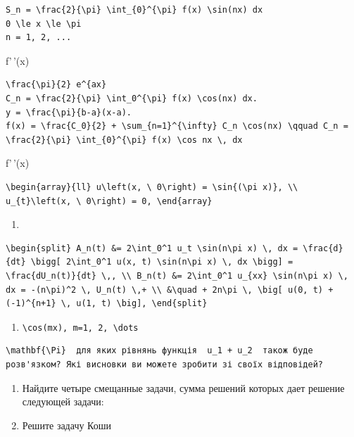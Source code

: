 \documentclass[
  ukrainian,
]{article}
\providecommand{\tightlist}{%
  \setlength{\itemsep}{0pt}\setlength{\parskip}{0pt}}
\begin{document}
\begin{verbatim}
S_n = \frac{2}{\pi} \int_{0}^{\pi} f(x) \sin(nx) dx
0 \le x \le \pi
n = 1, 2, ...
\end{verbatim}

f'\,'(x)

\begin{verbatim}
\frac{\pi}{2} e^{ax}
C_n = \frac{2}{\pi} \int_0^{\pi} f(x) \cos(nx) dx.
y = \frac{\pi}{b-a}(x-a).
f(x) = \frac{C_0}{2} + \sum_{n=1}^{\infty} C_n \cos(nx) \qquad C_n = \frac{2}{\pi} \int_{0}^{\pi} f(x) \cos nx \, dx
\end{verbatim}

f'\,'(x)

\begin{verbatim}
\begin{array}{ll} u\left(x, \ 0\right) = \sin{(\pi x)}, \\ u_{t}\left(x, \ 0\right) = 0, \end{array}
\end{verbatim}

\begin{enumerate}
\def\labelenumi{\alph{enumi})}
\tightlist
\item
\end{enumerate}

\begin{verbatim}
\begin{split} A_n(t) &= 2\int_0^1 u_t \sin(n\pi x) \, dx = \frac{d}{dt} \bigg[ 2\int_0^1 u(x, t) \sin(n\pi x) \, dx \bigg] = \frac{dU_n(t)}{dt} \,, \\ B_n(t) &= 2\int_0^1 u_{xx} \sin(n\pi x) \, dx = -(n\pi)^2 \, U_n(t) \,+ \\ &\quad + 2n\pi \, \big[ u(0, t) + (-1)^{n+1} \, u(1, t) \big], \end{split}
\end{verbatim}

\begin{enumerate}
\def\labelenumi{\arabic{enumi}.}
\setcounter{enumi}{4}
\tightlist
\item
  \texttt{\textbackslash{}cos(mx),\ m=1,\ 2,\ \textbackslash{}dots}
\end{enumerate}

\begin{verbatim}
\mathbf{\Pi}  для яких рівнянь функція  u_1 + u_2  також буде розв'язком? Які висновки ви можете зробити зі своїх відповідей?
\end{verbatim}

\begin{enumerate}
\def\labelenumi{\arabic{enumi}.}
\setcounter{enumi}{3}
\item
  Найдите четыре смещанные задачи, сумма решений которых дает решение
  следующей задачи:
\item
  Решите задачу Коши
\end{enumerate}
\end{document}

